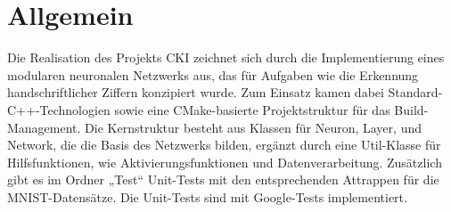 \section{Allgemein}
\label{sec:RealAllgemein}
Die Realisation des Projekts CKI zeichnet sich durch die Implementierung eines modularen neuronalen Netzwerks aus, das für Aufgaben wie die Erkennung handschriftlicher Ziffern konzipiert wurde. Zum Einsatz kamen dabei Standard-C++-Technologien sowie eine CMake-basierte Projektstruktur für das Build-Management. Die Kernstruktur besteht aus Klassen für Neuron, Layer, und Network, die die Basis des Netzwerks bilden, ergänzt durch eine Util-Klasse für Hilfsfunktionen, wie Aktivierungsfunktionen und Datenverarbeitung.
Zusätzlich gibt es im Ordner „Test“ Unit-Tests mit den entsprechenden Attrappen für die MNIST-Datensätze. Die Unit-Tests sind mit Google-Tests implementiert.

